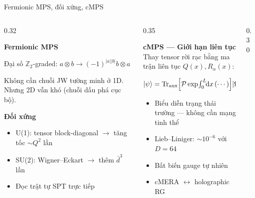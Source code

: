 \documentclass[aspectratio=169, 11pt]{beamer}
\begin{document}
\begin{frame}[shrink=3]{Fermionic MPS, đối xứng, cMPS}

\begin{columns}[T]
\begin{column}{0.32\textwidth}

\textcolor{qamber}{\textbf{Fermionic MPS}}\\[3pt]
{\small Đại số $\mathbb{Z}_2$-graded:
$a\!\otimes\! b\to(-1)^{|a||b|}b\!\otimes\! a$

\vspace{2pt}
Không cần chuỗi JW tường minh ở 1D. Nhưng 2D vẫn khó (chuỗi dấu phá cục bộ).}

\vspace{6pt}
\textcolor{qamber}{\textbf{Đối xứng}}\\[3pt]
{\small
\begin{itemize}
  \item U(1): tensor block-diagonal $\to$ tăng tốc $\sim Q^2$ lần
  \item SU(2): Wigner--Eckart $\to$ thêm $\bar{d}^3$ lần
  \item Đọc trật tự SPT trực tiếp
\end{itemize}}

\end{column}
\begin{column}{0.35\textwidth}

\textcolor{qamber}{\textbf{cMPS — Giới hạn liên tục}}\\[3pt]
{\small Thay tensor rời rạc bằng ma trận liên tục $Q(x), R_\alpha(x)$:}

\vspace{2pt}
{\footnotesize
$\ket{\psi} = \operatorname{Tr}_{\text{aux}}\!\left[\mathcal{P}\exp\!\int_0^L\!\!\mathrm{d}x\,(\cdots)\right]\!\ket{\Omega}$}

\vspace{4pt}
{\small
\begin{itemize}
  \item Biểu diễn trạng thái trường — không cần mạng tinh thể
  \item Lieb--Liniger: $\sim\!10^{-6}$ với $D\!=\!64$
  \item Bất biến gauge tự nhiên
  \item cMERA $\leftrightarrow$ holographic RG
\end{itemize}}

\end{column}
\begin{column}{0.30\textwidth}


\end{column}
\end{columns}
\end{frame}
\end{document}
